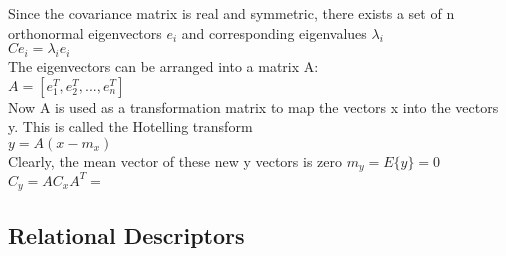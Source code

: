 Since the covariance matrix is real and symmetric, there exists a set of n orthonormal eigenvectors $e_i$ and corresponding eigenvalues $\lambda_i$\\
$Ce_i=\lambda_ie_i$\\
The eigenvectors can be arranged into a matrix A:\\
$A=[e_1^T, e_2^T, ..., e_n^T]$\\
Now A is used as a transformation matrix to map the vectors x into the vectors y. This is called the Hotelling transform\\
$y=A(x-m_x)$\\
Clearly, the mean vector of these new y vectors is zero $m_y=E\{y\}=0$\\
$C_y=AC_xA^T=$\\ %

\subsection{Relational Descriptors}
